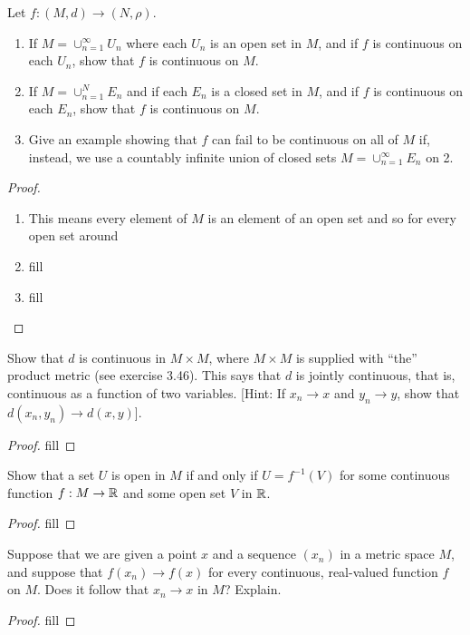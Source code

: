 \begin{exercise}{31}
Let $f: (M,d) \to (N,\rho)$.
\begin{enumerate}
    \item If $M =\cup^\infty_{n=1} U_n$ where each $U_n$ is an open set in $M$, and if $f$ is continuous on each $U_n$, show that $f$ is continuous on $M$.
    \item If $M =\cup^N_{n=1} E_n$ and if each $E_n$ is a closed set in $M$, and if $f$ is continuous on each $E_n$, show that $f$ is continuous on $M$.
    \item Give an example showing that $f$ can fail to be continuous on all of $M$ if, instead, we use a countably infinite union of closed sets $M = \cup^\infty_{n=1} E_n$ on 2.
\end{enumerate}
\end{exercise}
\begin{proof}
\begin{enumerate}
    \item This means every element of $M$ is an element of an open set and so for every open set around 
    \item fill
    \item fill
\end{enumerate}
\end{proof} 

\begin{exercise}{34}
Show that $d$ is continuous in $M \times M$, where $M \times M$ is supplied with ``the'' product metric (see exercise 3.46).
This says that $d$ is jointly continuous, that is, continuous as a function of two variables.
[Hint: If $x_n \to x$ and $y_n \to y$, show that $d(x_n,y_n) \to d(x,y)$].
\end{exercise}
\begin{proof}
fill
\end{proof} 

\begin{exercise}{35}
Show that a set $U$ is open in $M$ if and only if $U=f^{-1}(V)$ for some continuous function $f: M \to \mathbb{R}$ and some open set $V$ in $\mathbb{R}$.
\end{exercise}
\begin{proof}
fill
\end{proof} 

\begin{exercise}{36}
Suppose that we are given a point $x$ and a sequence $(x_n)$ in a metric space $M$, and suppose that $f(x_n) \to f(x)$ for every continuous, real-valued function $f$ on $M$.
Does it follow that $x_n \to x$ in $M$?
Explain.
\end{exercise}
\begin{proof}
fill
\end{proof} 
